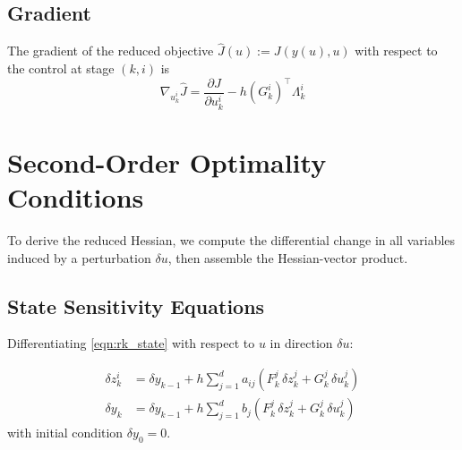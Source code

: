 \documentclass[11pt]{article}
\newcommand{\tp}{^\top}
\newcommand{\pder}[2]{\frac{\partial #1}{\partial #2}}
\begin{document}
\subsection{Gradient}

The gradient of the reduced objective $\hat{J}(u) := J(y(u),u)$ with respect to the control at stage $(k,i)$ is
\begin{equation}
\label{eqn:gradient}
\boxed{
\nabla_{u_k^i} \hat{J} = \pder{J}{u_k^i} - h (G_k^i)\tp \Lambda_k^i
}
\end{equation}

\section{Second-Order Optimality Conditions}

To derive the reduced Hessian, we compute the differential change in all variables induced by a perturbation $\delta u$, then assemble the Hessian-vector product.

\subsection{State Sensitivity Equations}

Differentiating \eqref{eqn:rk_state} with respect to $u$ in direction $\delta u$:

\begin{equation}
\label{eqn:state_sensitivity}
\boxed{
\begin{aligned}
\delta z_k^i &= \delta y_{k-1} + h\sum_{j=1}^d a_{ij} \left( F_k^j \,\delta z_k^j + G_k^j\, \delta u_k^j \right) \\[4pt]
\delta y_k &= \delta y_{k-1} + h\sum_{j=1}^d b_j \left( F_k^j\, \delta z_k^j + G_k^j\, \delta u_k^j \right)
\end{aligned}
}
\end{equation}
with initial condition $\delta y_0 = 0$.
\end{document}
